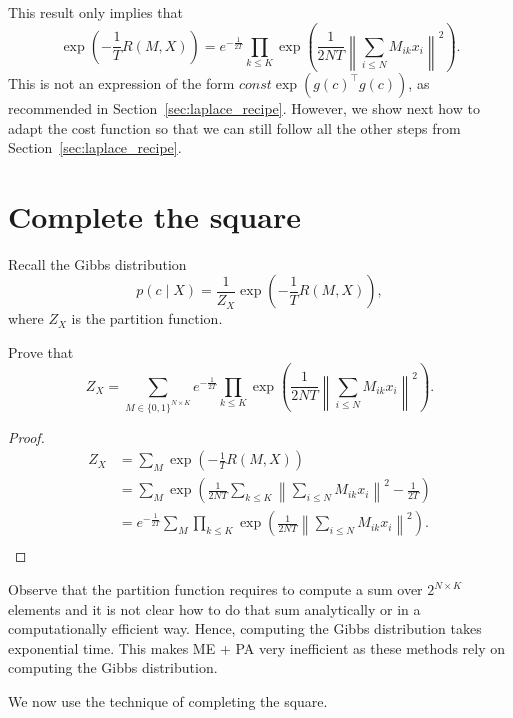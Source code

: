 This result only implies that
%
\begin{equation}
\exp\left(-\frac{1}{T}R(M, X)\right) = e^{-\frac{1}{2T}}\prod_{k \leq K}\exp\left(\frac{1}{2NT}\left\|\sum_{i \leq N}M_{ik}x_i\right\|^2\right).
\end{equation}
%
This is not an expression of the form $\textit{const} \exp\left(g(c)^\top g(c)\right)$, as recommended in Section~\ref{sec:laplace_recipe}. However, we show next how to adapt the cost function so that we can still follow all the other steps from Section~\ref{sec:laplace_recipe}.

\section{Complete the square}

Recall the Gibbs distribution
%
$$p(c \mid X) = \frac{1}{Z_X}\exp\left(-\frac{1}{T}R(M, X)\right),$$
%
where $Z_X$ is the partition function. 

\begin{exercise}
Prove that
%
\begin{equation}
Z_X = \sum_{M \in \{0, 1\}^{N \times K}}e^{-\frac{1}{2T}}\prod_{k \leq K} \exp\left(\frac{1}{2NT}\left\|\sum_{i \leq N} M_{ik}x_i\right\|^2\right).
\label{eq:partition_function}
\end{equation}
%
\end{exercise}

\begin{proof}
\begin{align*}
Z_X &= \sum_{M} \exp\left(-\frac{1}{T}R(M, X)\right)\\
&= \sum_{M} \exp\left(\frac{1}{2NT}\sum_{k \leq K}\left\|\sum_{i \leq N} M_{ik}x_i\right\|^2 - \frac{1}{2T}\right)\\
&= e^{-\frac{1}{2T}}\sum_{M} \prod_{k \leq K}\exp\left(\frac{1}{2NT}\left\|\sum_{i \leq N} M_{ik}x_i\right\|^2\right).\\
\end{align*}
\end{proof}

Observe that the partition function requires to compute a sum over $2^{N \times K}$ elements and it is not clear how to do that sum analytically or in a computationally efficient way. Hence, computing the Gibbs distribution takes exponential time. This makes ME + PA very inefficient as these methods rely on computing the Gibbs distribution.

We now use the technique of completing the square.

